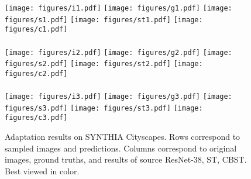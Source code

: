\documentclass[runningheads]{llncs}
\begin{document}
\begin{figure}[!t]
\centering
{}
\vspace{0.2mm}

\texttt{[image: figures/i1.pdf]}
\texttt{[image: figures/g1.pdf]}
\texttt{[image: figures/s1.pdf]}
\texttt{[image: figures/st1.pdf]}
\texttt{[image: figures/c1.pdf]}\\
\quad\\\vspace{-0.325cm}
\texttt{[image: figures/i2.pdf]}
\texttt{[image: figures/g2.pdf]}
\texttt{[image: figures/s2.pdf]}
\texttt{[image: figures/st2.pdf]}
\texttt{[image: figures/c2.pdf]}\\
\quad\\\vspace{-0.325cm}
\texttt{[image: figures/i3.pdf]}
\texttt{[image: figures/g3.pdf]}
\texttt{[image: figures/s3.pdf]}
\texttt{[image: figures/st3.pdf]}
\texttt{[image: figures/c3.pdf]}
\caption{Adaptation results on SYNTHIA  Cityscapes. Rows correspond to sampled images and predictions. Columns correspond to original images, ground truths, and results of source ResNet-38, ST, CBST. Best viewed in color.}\label{syn2city}
\end{figure}
\end{document}
